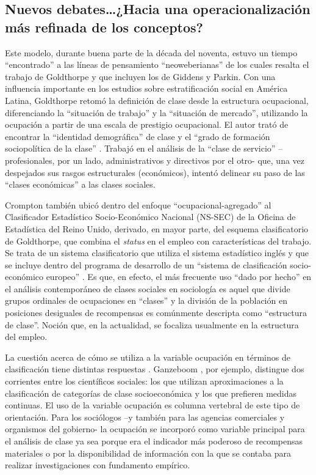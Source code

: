 \documentclass[
]{book}
\begin{document}
\hypertarget{nuevos-debateshacia-una-operacionalizaciuxf3n-muxe1s-refinada-de-los-conceptos}{%
\subsection{Nuevos debates\ldots¿Hacia una operacionalización más refinada de los conceptos?}\label{nuevos-debateshacia-una-operacionalizaciuxf3n-muxe1s-refinada-de-los-conceptos}}

Este modelo, durante buena parte de la década del noventa, estuvo un tiempo ``encontrado'' a las líneas de pensamiento ``neoweberianas'' de los cuales resalta el trabajo de Goldthorpe y que incluyen los de Giddens y Parkin. Con una influencia importante en los estudios sobre estratificación social en América Latina, Goldthorpe retomó la definición de clase desde la estructura ocupacional, diferenciando la ``situación de trabajo'' y la ``situación de mercado'', utilizando la ocupación a partir de una escala de prestigio ocupacional. El autor trató de encontrar la ``identidad demográfica'' de clase y el ``grado de formación sociopolítica de la clase'' \citep[p.~74]{Martinez2005}. Trabajó en el análisis de la ``clase de servicio'' --profesionales, por un lado, administrativos y directivos por el otro- que, una vez despejados sus rasgos estructurales (económicos), intentó delinear su paso de las ``clases económicas'' a las clases sociales.

Crompton también ubicó dentro del enfoque ``ocupacional-agregado'' al Clasificador Estadístico Socio-Económico Nacional (NS-SEC) de la Oficina de Estadística del Reino Unido, derivado, en mayor parte, del esquema clasificatorio de Goldthorpe, que combina el \emph{status} en el empleo con características del trabajo. Se trata de un sistema clasificatorio que utiliza el sistema estadístico inglés y que se incluye dentro del programa de desarrollo de un ``sistema de clasificación socio-económico europeo'' \citep{Rose2007}. Es que, en efecto, el más frecuente uso ``dado por hecho'' en el análisis contemporáneo de clases sociales en sociología es aquel que divide grupos ordinales de ocupaciones en ``clases'' \citep[p.~49]{Crompton2008} y la división de la población en posiciones desiguales de recompensas es comúnmente descripta como ``estructura de clase''. Noción que, en la actualidad, se focaliza usualmente en la estructura del empleo.

La cuestión acerca de cómo se utiliza a la variable ocupación en términos de clasificación tiene distintas respuestas \citep{Desrosieres2000}. Ganzeboom \citeyearpar{Ganzeboom1992}, por ejemplo, distingue dos corrientes entre los científicos sociales: los que utilizan aproximaciones a la clasificación de categorías de clase socioeconómica y los que prefieren medidas continuas. El uso de la variable ocupación es columna vertebral de este tipo de orientación. Para los sociólogos --y también para las agencias comerciales y organismos del gobierno- la ocupación se incorporó como variable principal para el análisis de clase ya sea porque era el indicador más poderoso de recompensas materiales o por la disponibilidad de información con la que se contaba para realizar investigaciones con fundamento empírico.
\end{document}
